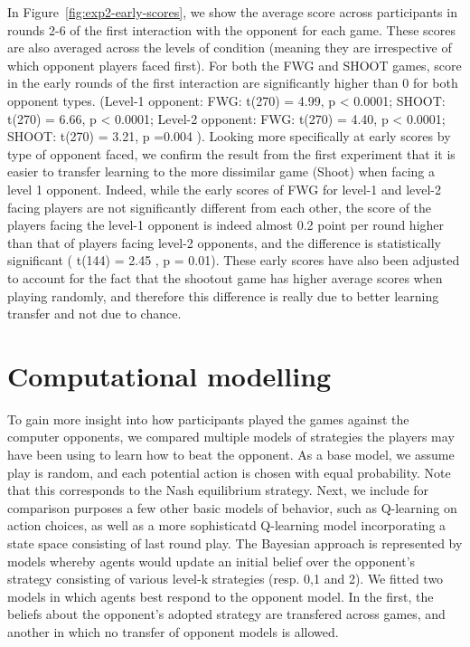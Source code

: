 \documentclass[man,floatsintext]{apa6}
\begin{document}
In Figure~\ref{fig:exp2-early-scores}, we show the average score across participants in rounds 2-6 of the first interaction with the opponent for each game. These scores are also averaged across the levels of condition (meaning they are irrespective of which opponent players faced first). For both the FWG and SHOOT games, score in the early rounds of the first interaction are significantly higher than 0 for both opponent types. (Level-1 opponent: FWG: t(270) = 4.99, p \textless{} 0.0001; SHOOT: t(270) = 6.66, p \textless{} 0.0001; Level-2 opponent: FWG: t(270) = 4.40, p \textless{} 0.0001; SHOOT: t(270) = 3.21, p =0.004 ). Looking more specifically at early scores by type of opponent faced, we confirm the result from the first experiment that it is easier to transfer learning to the more dissimilar game (Shoot) when facing a level 1 opponent. Indeed, while the early scores of FWG for level-1 and level-2 facing players are not significantly different from each other, the score of the players facing the level-1 opponent is indeed almost 0.2 point per round higher than that of players facing level-2 opponents, and the difference is statistically significant ( t(144) = 2.45 , p = 0.01). These early scores have also been adjusted to account for the fact that the shootout game has higher average scores when playing randomly, and therefore this difference is really due to better learning transfer and not due to chance.

\hypertarget{computational-modelling}{%
\section{Computational modelling}\label{computational-modelling}}

To gain more insight into how participants played the games against the computer opponents, we compared multiple models of strategies the players may have been using to learn how to beat the opponent. As a base model, we assume play is random, and each potential action is chosen with equal probability. Note that this corresponds to the Nash equilibrium strategy. Next, we include for comparison purposes a few other basic models of behavior, such as Q-learning on action choices, as well as a more sophisticatd Q-learning model incorporating a state space consisting of last round play. The Bayesian approach is represented by models whereby agents would update an initial belief over the opponent's strategy consisting of various level-k strategies (resp. 0,1 and 2). We fitted two models in which agents best respond to the opponent model. In the first, the beliefs about the opponent's adopted strategy are transfered across games, and another in which no transfer of opponent models is allowed.
\end{document}
